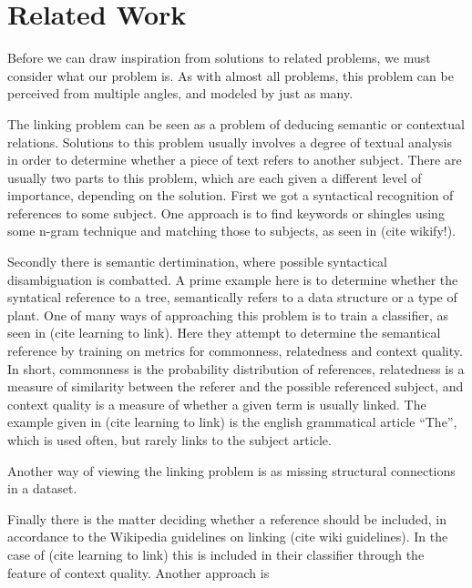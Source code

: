 \section{Related Work}\label{sec:related_work}

Before we can draw inspiration from solutions to related problems, we must consider what our problem is. As with almost all problems, this problem can be perceived from multiple angles, and modeled by just as many.

The linking problem can be seen as a problem of deducing semantic or contextual relations. Solutions to this problem usually involves a degree of textual analysis in order to determine whether a piece of text refers to another subject. There are usually two parts to this problem, which are each given a different level of importance, depending on the solution. First we got a syntactical recognition of references to some subject. One approach is to find keywords or shingles using some n-gram technique and matching those to subjects, as seen in (cite wikify!). 

Secondly there is semantic dertimination, where possible syntactical disambiguation is combatted. A prime example here is to determine whether the syntatical reference to a tree, semantically refers to a data structure or a type of plant. One of many ways of approaching this problem is to train a classifier, as seen in (cite learning to link). Here they attempt to determine the semantical reference by training on metrics for commonness, relatedness and context quality. In short, commonness is the probability distribution of references, relatedness is a measure of similarity between the referer and the possible referenced subject, and context quality is a measure of whether a given term is usually linked. The example given in (cite learning to link) is the english grammatical article \enquote{The}, which is used often, but rarely links to the subject article.


Another way of viewing the linking problem is as missing structural connections in a dataset.


Finally there is the matter deciding whether a reference should be included, in accordance to the Wikipedia guidelines on linking (cite wiki guidelines). In the case of (cite learning to link) this is included in their classifier through the feature of context quality. Another approach is 









